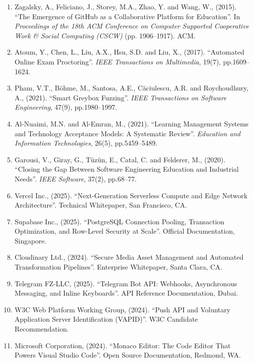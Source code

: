 {\begin{enumerate}[noitemsep,topsep=2pt,leftmargin=*]
  \item Zagalsky, A., Feliciano, J., Storey, M.A., Zhao, Y. and Wang, W., (2015). ``The Emergence of GitHub as a Collaborative Platform for Education''. In \textit{Proceedings of the 18th ACM Conference on Computer Supported Cooperative Work \& Social Computing (CSCW)} (pp. 1906--1917). ACM.
  \item Atoum, Y., Chen, L., Liu, A.X., Hsu, S.D. and Liu, X., (2017). ``Automated Online Exam Proctoring''. \textit{IEEE Transactions on Multimedia}, 19(7), pp.1609--1624.
  \item Pham, V.T., B\"{o}hme, M., Santosa, A.E., C\u{a}ciulescu, A.R. and Roychoudhury, A., (2021). ``Smart Greybox Fuzzing''. \textit{IEEE Transactions on Software Engineering}, 47(9), pp.1980--1997.
  \item Al-Nuaimi, M.N. and Al-Emran, M., (2021). ``Learning Management Systems and Technology Acceptance Models: A Systematic Review''. \textit{Education and Information Technologies}, 26(5), pp.5459--5489.
  \item Garousi, V., Giray, G., T\"{u}z\"{u}n, E., Catal, C. and Felderer, M., (2020). ``Closing the Gap Between Software Engineering Education and Industrial Needs''. \textit{IEEE Software}, 37(2), pp.68--77.
  \item Vercel Inc., (2025). ``Next-Generation Serverless Compute and Edge Network Architecture''. Technical Whitepaper, San Francisco, CA.
  \item Supabase Inc., (2025). ``PostgreSQL Connection Pooling, Transaction Optimization, and Row-Level Security at Scale''. Official Documentation, Singapore.
  \item Cloudinary Ltd., (2024). ``Secure Media Asset Management and Automated Transformation Pipelines''. Enterprise Whitepaper, Santa Clara, CA.
  \item Telegram FZ-LLC, (2025). ``Telegram Bot API: Webhooks, Asynchronous Messaging, and Inline Keyboards''. API Reference Documentation, Dubai.
  \item W3C Web Platform Working Group, (2024). ``Push API and Voluntary Application Server Identification (VAPID)''. W3C Candidate Recommendation.
  \item Microsoft Corporation, (2024). ``Monaco Editor: The Code Editor That Powers Visual Studio Code''. Open Source Documentation, Redmond, WA.
\end{enumerate}\par}
\newpage
